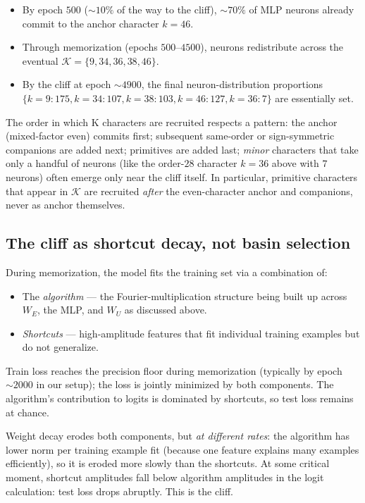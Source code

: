 \begin{itemize}[leftmargin=*]
  \item By epoch $500$ ($\sim 10\%$ of the way to the cliff), $\sim 70\%$
        of MLP neurons already commit to the anchor character $k = 46$.
  \item Through memorization (epochs $500$--$4500$), neurons redistribute
        across the eventual $\mathcal K = \{9, 34, 36, 38, 46\}$.
  \item By the cliff at epoch $\sim 4900$, the final neuron-distribution
        proportions $\{k\!=\!9 \!: 175, k\!=\!34 \!: 107, k\!=\!38 \!: 103,
        k\!=\!46 \!: 127, k\!=\!36 \!: 7\}$ are essentially set.
\end{itemize}

The order in which K characters are recruited respects a pattern: the anchor
(mixed-factor even) commits first; subsequent same-order or
sign-symmetric companions are added next; primitives are added last;
\emph{minor} characters that take only a handful of neurons (like the
order-$28$ character $k = 36$ above with $7$ neurons) often emerge only
near the cliff itself.  In particular, primitive characters that appear in
$\mathcal K$ are recruited \emph{after} the even-character anchor and
companions, never as anchor themselves.

\subsection{The cliff as shortcut decay, not basin selection}
\label{subsec:bgeo-cliff}

During memorization, the model fits the training set via a combination of:
\begin{itemize}[leftmargin=*]
  \item The \emph{algorithm} --- the Fourier-multiplication structure being
        built up across $W_E$, the MLP, and $W_U$ as discussed above.
  \item \emph{Shortcuts} --- high-amplitude features that fit individual
        training examples but do not generalize.
\end{itemize}
Train loss reaches the precision floor during memorization (typically by
epoch $\sim 2000$ in our setup); the loss is jointly minimized by both
components.  The algorithm's contribution to logits is dominated by
shortcuts, so test loss remains at chance.

Weight decay erodes both components, but \emph{at different rates}: the
algorithm has lower norm per training example fit (because one feature
explains many examples efficiently), so it is eroded more slowly than the
shortcuts.  At some critical moment, shortcut amplitudes fall below
algorithm amplitudes in the logit calculation: test loss drops abruptly.
This is the cliff.

